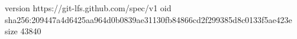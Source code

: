 version https://git-lfs.github.com/spec/v1
oid sha256:209447a4d6425aa964d0b0839ae31130fb84866cd2f299385d8c0133f5ae423e
size 43840
